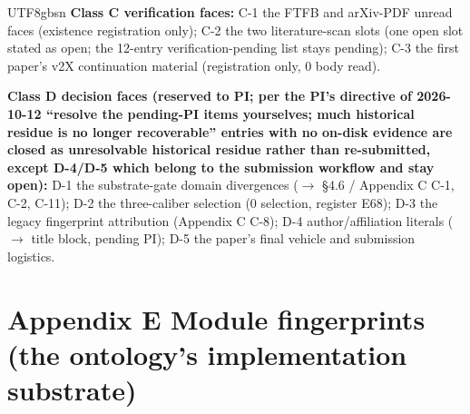 \documentclass[11pt,letterpaper]{article}
\begin{document}
\begin{CJK}{UTF8}{gbsn}
\textbf{Class C \textemdash{} verification faces:} C-1 the FTFB and arXiv-PDF unread faces (existence registration only); C-2 the two literature-scan slots (one open slot stated as open; the 12-entry verification-pending list stays pending); C-3 the first paper's v2X continuation material (registration only, 0 body read).

\textbf{Class D \textemdash{} decision faces (reserved to PI; per the PI's directive of 2026-10-12 \textemdash{} ``resolve the pending-PI items yourselves; much historical residue is no longer recoverable'' \textemdash{} entries with no on-disk evidence are closed as unresolvable historical residue rather than re-submitted, except D-4/D-5 which belong to the submission workflow and stay open):} D-1 the substrate-gate domain divergences (\ensuremath{\to} \S{}4.6 / Appendix C C-1, C-2, C-11); D-2 the three-caliber selection (0 selection, register E68); D-3 the legacy fingerprint attribution (Appendix C C-8); D-4 author/affiliation literals (\ensuremath{\to} title block, pending PI); D-5 the paper's final vehicle and submission logistics.

\section*{Appendix E \textemdash{} Module fingerprints (the ontology's implementation substrate)}


\end{CJK}
\end{document}
